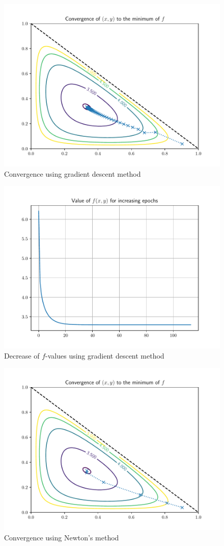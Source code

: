\documentclass[letterpaper,headings=standardclasses]{scrartcl}
\begin{document}
\pagebreak

\begin{figure}[H]
\centering
\includegraphics[width=.7\linewidth]{gd_graph.pdf}
\caption{Convergence using gradient descent method}
\label{gd_graph}
\end{figure}

\begin{figure}[H]
\centering
\includegraphics[width=.7\linewidth]{gd_fval.pdf}
\caption{Decrease of $f$-values using gradient descent method}
\label{gd_fval}
\end{figure}

\begin{figure}[H]
\centering
\includegraphics[width=.7\linewidth]{nm_graph.pdf}
\caption{Convergence using Newton's method}
\label{nm_graph}
\end{figure}
\end{document}
